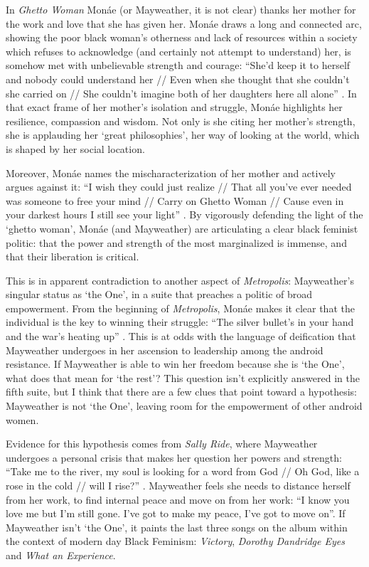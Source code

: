 \documentclass[a4paper, 11pt]{article} %
\begin{document}
In \emph{Ghetto Woman} Mon\'ae (or Mayweather, it is not clear) thanks her mother for the work and love that she has given her.
Mon\'ae draws a long and connected arc, showing the poor black woman's otherness and lack of resources within a society which refuses to acknowledge (and certainly not attempt to understand) her, is somehow met with unbelievable strength and courage:
``She'd keep it to herself and nobody could understand her // Even when she thought that she couldn't she carried on // She couldn't imagine both of her daughters here all alone'' \cite{ghettowoman}.
In that exact frame of her mother's isolation and struggle, Mon\'ae highlights her resilience, compassion and wisdom.
Not only is she citing her mother's strength, she is applauding her `great philosophies', her way of looking at the world, which is shaped by her social location.

Moreover, Mon\'ae names the mischaracterization of her mother and actively argues against it:
``I wish they could just realize // That all you've ever needed was someone to free your mind // Carry on Ghetto Woman // Cause even in your darkest hours I still see your light'' \cite{ghettowoman}.
By vigorously defending the light of the `ghetto woman', Mon\'ae (and Mayweather) are articulating a clear black feminist politic: that the power and strength of the most marginalized is immense, and that their liberation is critical. 

This is in apparent contradiction to another aspect of \emph{Metropolis}: Mayweather's singular status as `the One', in a suite that preaches a politic of broad empowerment.
From the beginning of \emph{Metropolis}, Mon\'ae makes it clear that the individual is the key to winning their struggle:
``The silver bullet's in your hand and the war's heating up'' \cite{manymoons}.
This is at odds with the language of deification that Mayweather undergoes in her ascension to leadership among the android resistance.
 If Mayweather is able to win her freedom because she is `the One', what does that mean for `the rest'?
This question isn't explicitly answered in the fifth suite, but I think that there are a few clues that point toward a hypothesis: Mayweather is not `the One', leaving room for the empowerment of other android women.

Evidence for this hypothesis comes from \emph{Sally Ride}, where Mayweather undergoes a personal crisis that makes her question her powers and strength:
 ``Take me to the river, my soul is looking for a word from God // Oh God, like a rose in the cold // will I rise?'' \cite{sallyride}.
Mayweather feels she needs to distance herself from her work, to find internal peace and move on from her work:
 ``I know you love me but I'm still gone. I've got to make my peace, I've got to move on''\cite{sallyride}.
 If Mayweather isn't `the One', it paints the last three songs on the album within the context of modern day Black Feminism: \emph{Victory}, \emph{Dorothy Dandridge Eyes} and \emph{What an Experience}.
 
\end{document}
